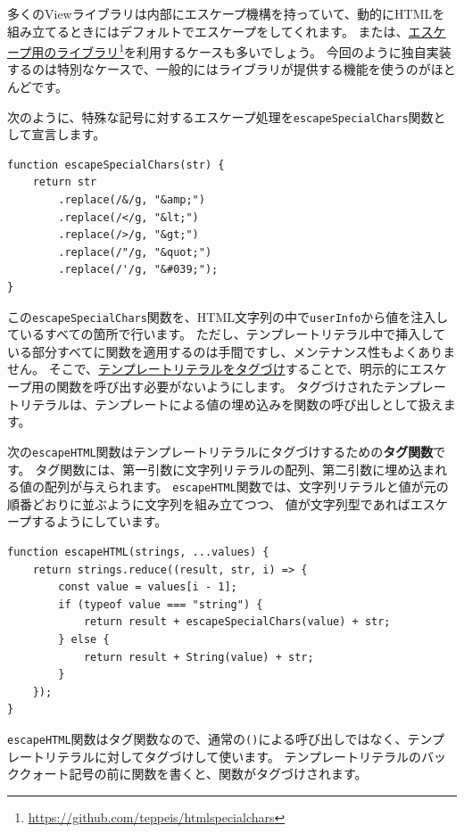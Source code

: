 多くのViewライブラリは内部にエスケープ機構を持っていて、動的にHTMLを組み立てるときにはデフォルトでエスケープをしてくれます。
または、\href{https://github.com/teppeis/htmlspecialchars}{エスケープ用のライブラリ}\footnote{\url{https://github.com/teppeis/htmlspecialchars}}を利用するケースも多いでしょう。
今回のように独自実装するのは特別なケースで、一般的にはライブラリが提供する機能を使うのがほとんどです。

次のように、特殊な記号に対するエスケープ処理を\texttt{escapeSpecialChars}関数として宣言します。

\begin{lstlisting}
function escapeSpecialChars(str) {
    return str
        .replace(/&/g, "&amp;")
        .replace(/</g, "&lt;")
        .replace(/>/g, "&gt;")
        .replace(/"/g, "&quot;")
        .replace(/'/g, "&#039;");
}
\end{lstlisting}

この\texttt{escapeSpecialChars}関数を、HTML文字列の中で\texttt{userInfo}から値を注入しているすべての箇所で行います。
ただし、テンプレートリテラル中で挿入している部分すべてに関数を適用するのは手間ですし、メンテナンス性もよくありません。
そこで、\href{https://developer.mozilla.org/ja/docs/Web/JavaScript/Reference/template_strings\#タグづけされたTemplate_literal}{テンプレートリテラルをタグづけ}することで、明示的にエスケープ用の関数を呼び出す必要がないようにします。
タグづけされたテンプレートリテラルは、テンプレートによる値の埋め込みを関数の呼び出しとして扱えます。

次の\texttt{escapeHTML}関数はテンプレートリテラルにタグづけするための\textbf{タグ関数}です。
タグ関数には、第一引数に文字列リテラルの配列、第二引数に埋め込まれる値の配列が与えられます。
\texttt{escapeHTML}関数では、文字列リテラルと値が元の順番どおりに並ぶように文字列を組み立てつつ、
値が文字列型であればエスケープするようにしています。

\begin{lstlisting}
function escapeHTML(strings, ...values) {
    return strings.reduce((result, str, i) => {
        const value = values[i - 1];
        if (typeof value === "string") {
            return result + escapeSpecialChars(value) + str;
        } else {
            return result + String(value) + str;
        }
    });  
}
\end{lstlisting}

\texttt{escapeHTML}関数はタグ関数なので、通常の\texttt{()}による呼び出しではなく、テンプレートリテラルに対してタグづけして使います。
テンプレートリテラルのバッククォート記号の前に関数を書くと、関数がタグづけされます。

